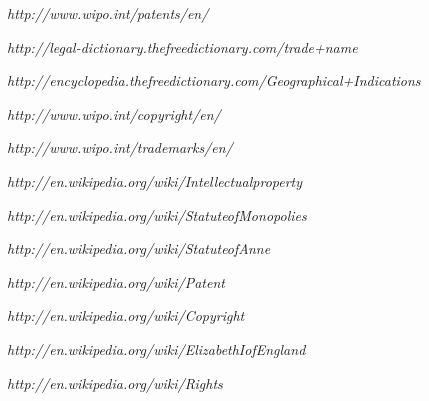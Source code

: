\documentclass[a4paper,11pt]{article}
\begin{document}
\begin{thebibliography}{12}

\textit{http://www.wipo.int/patents/en/}

\textit{http://legal-dictionary.thefreedictionary.com/trade+name}

\textit{http://encyclopedia.thefreedictionary.com/Geographical+Indications}

\textit{http://www.wipo.int/copyright/en/}

\textit{http://www.wipo.int/trademarks/en/}

\textit{http://en.wikipedia.org/wiki/Intellectual\textunderscore property}

\textit{http://en.wikipedia.org/wiki/Statute\textunderscore of\textunderscore Monopolies}

\textit{http://en.wikipedia.org/wiki/Statute\textunderscore of\textunderscore Anne}

\textit{http://en.wikipedia.org/wiki/Patent}

\textit{http://en.wikipedia.org/wiki/Copyright}

\textit{http://en.wikipedia.org/wiki/Elizabeth\textunderscore I\textunderscore of\textunderscore England}

\textit{http://en.wikipedia.org/wiki/Rights}

\end{thebibliography}
\end{document}

